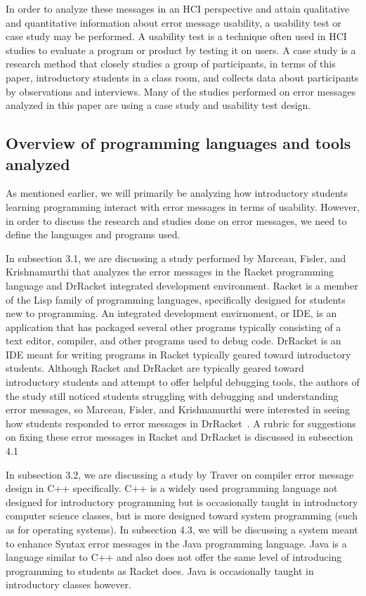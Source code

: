 \documentclass{sig-alternate}
\begin{document}
In order to analyze these messages in an HCI perspective and attain qualitative and quantitative information about error message usability, a usability test or case study may be performed. A usability test is a technique often used in HCI studies to evaluate a program or product by testing it on users. A case study is a research method that closely studies a group of participants, in terms of this paper, introductory students in a class room, and collects data about participants by observations and interviews. Many of the studies performed on error messages analyzed in this paper are using a case study and usability test design. 



\subsection{Overview of programming languages and tools analyzed}

As mentioned earlier, we will primarily be analyzing how introductory students learning programming interact with error messages in terms of usability. However, in order to discuss the research and studies done on error messages, we need to define the languages and programs used.  

In subsection 3.1, we are discussing a study performed by Marceau, Fisler, and Krishnamurthi that analyzes the error messages in the Racket programming language and DrRacket integrated development environment. Racket is a member of the Lisp family of programming languages, specifically designed for students new to programming. An integrated development envirnoment, or IDE, is an application that has packaged several other programs typically consisting of a text editor, compiler, and other programs used to debug code. DrRacket is an IDE meant for writing programs in Racket typically geared toward introductory students. Although Racket and DrRacket are typically geared toward introductory students and attempt to offer helpful debugging tools, the authors of the study still noticed students struggling with debugging and understanding error messages, so Marceau, Fisler, and Krishnamurthi were interested in seeing how students responded to error messages in DrRacket~\cite{Marceau:2011:MYL:2048237.2048241}. A rubric for suggestions on fixing these error messages in Racket and DrRacket is discussed in subsection 4.1 

In subsection 3.2, we are discussing a study by Traver on compiler error message design in C++ specifically. C++ is a widely used programming language not designed for introductory programming but is occasionally taught in introductory computer science classes, but is more designed toward system programming (such as for operating systems). In subsection 4.3, we will be discussing a system meant to enhance Syntax error messages in the Java programming language. Java is a language similar to C++ and also does not offer the same level of introducing programming to students as Racket does. Java is occasionally taught in introductory classes however.  
\end{document}
